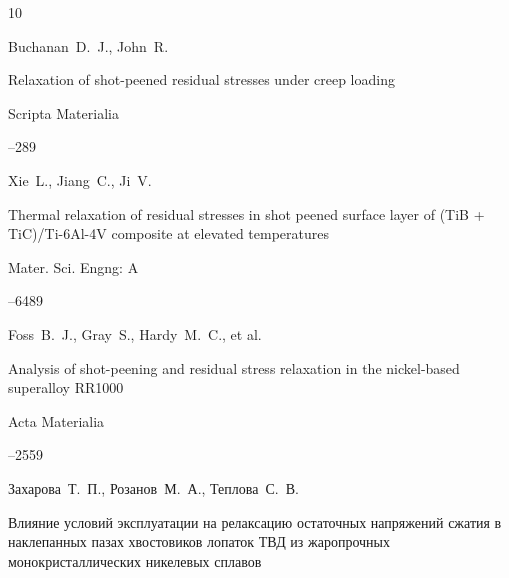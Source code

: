 \begin{thebibliography}{10}


\by Buchanan~D.~J., John~R.

\paper Relaxation of shot-peened residual stresses under creep loading

\jour Scripta Materialia




--289






\by Xie~L., Jiang~C., Ji~V.

\paper Thermal relaxation of residual stresses in shot peened surface layer of (TiB + TiC)/Ti-6Al-4V composite at elevated temperatures

\jour Mater. Sci. Engng: A




--6489






\by Foss~B.~J., Gray~S., Hardy~M.~C., et al.

\paper Analysis of shot-peening and residual stress relaxation in the nickel-based superalloy RR1000

\jour Acta Materialia




--2559






\by Захарова~Т.~П., Розанов~М.~А., Теплова~С.~В.

\paper Влияние условий эксплуатации на релаксацию остаточных напряжений сжатия в наклепанных пазах хвостовиков лопаток ТВД из жаропрочных монокристаллических никелевых сплавов


\end{thebibliography}
